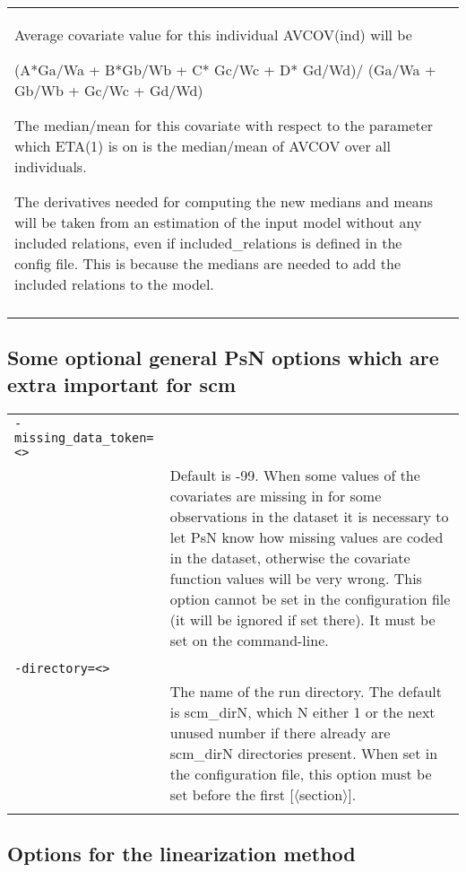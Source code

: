 \documentclass[a4paper,12pt]{article}
\begin{document}
\begin{longtable}{p{1in}p{4in}}
Average covariate value for this individual  AVCOV(ind) will be

(A*Ga/Wa + B*Gb/Wb + C* Gc/Wc + D* Gd/Wd)/
(Ga/Wa + Gb/Wb + Gc/Wc + Gd/Wd)

The median/mean for this covariate with respect to the parameter which ETA(1) is on is the median/mean of AVCOV over all individuals.

The derivatives needed for computing the new medians and means will be taken from an estimation of the input model without any included relations, even if included\_relations is defined in the config file. This is because the medians are needed to add the included relations to the model.\\
\\
\end{longtable}

\subsection{Some optional general PsN options which are extra important for scm}

\begin{longtable}{p{1in}p{4in}}
\verb|-missing_data_token=<>| & \\
\nopagebreak
 & Default is -99. When some values of the covariates are missing in for some observations in the dataset it is necessary to let PsN know how missing values are coded in the dataset, otherwise the covariate function values will be very wrong. This option cannot be set in the configuration file (it will be ignored if set there). It must be set on the command-line. \\
\\
\verb|-directory=<>| & \\
\nopagebreak
 & The name of the run directory. The default is scm\_dirN, which N either 1 or the next unused number if there already are scm\_dirN directories present. When set in the configuration file, this option must be set before the first [$\langle$section$\rangle$]. \\
\\
\end{longtable}

\subsection{Options  for the linearization method}
\end{document}
